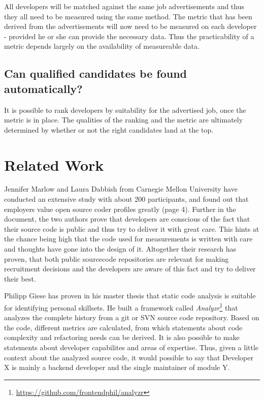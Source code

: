 All developers will be matched against the same job advertisements and thus
they all need to be measured using the same method. The metric that
has been derived from the advertisements will now need to be measured
on each developer - provided he or she can provide the necessary data.
Thus the practicability of a metric depends largely on the availability
of measureable data.

\subsection{Can qualified candidates be found automatically?}\label{subsec:measurement-quality}
It is possible to rank developers by suitability for the advertised job,
once the metric is in place. The qualities of the ranking and the metric
are ultimately determined by whether or not the right candidates land at
the top.


\section{Related Work}

Jennifer Marlow and Laura Dabbish\cite{md:2013} from Carnegie Mellon
University have conducted an extensive study with about
200 participants, and found out that employers value
open source coder profiles greatly (page 4). Further in the document,
the two authors prove that developers are conscious of the fact
that their source code is public and thus try to deliver it with
great care. This hints at the chance being high that the code used for measurements
is written with care and thoughts have gone into the design of it.
Altogether their research has proven, that both public sourcecode repositories
are relevant for making recruitment decisions and the developers
are aware of this fact and try to deliver their best.
\newline

Philipp Giese has proven in his master thesis\cite{pg:2014} that
static code analysis is suitable for identifying personal skillsets.
He built a framework called \textit{Analyzr}\footnote{\url{https://github.com/frontendphil/analyzr}}
that analyzes the complete history from a git or SVN source code repository.
Based on the code, different metrics are calculated, from which statements about
code complexity and refactoring needs can be derived. It is also possible
to make statements about developer capabilites and areas of expertise.
Thus, given a little context about the analyzed source code, it would possible
to say that \glqq Developer X is mainly a backend developer and the single maintainer of module Y\grqq.
\newline

